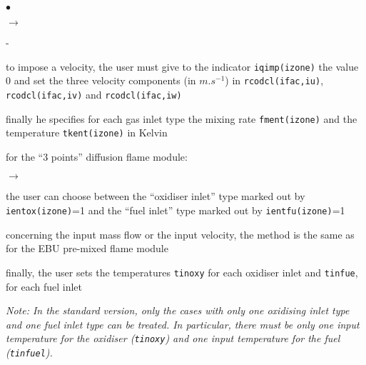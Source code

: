 {{{\begin{list}{$\bullet$}{}
\begin{list}{$\rightarrow$}{}
\begin{list}{-}{}
                                 \item to impose a velocity, the user
                                       must give to the indicator
                                       \texttt{iqimp(izone)} the value 0 and set
                                       the three velocity components (in
                                       $m.s^{-1}$) in
                                       \texttt{rcodcl(ifac,iu)},
                                       \texttt{rcodcl(ifac,iv)} and
                                       \texttt{rcodcl(ifac,iw)}
                          \end{list}
                    \item finally he specifies for each gas inlet type
                          the mixing rate \texttt{fment(izone)} and
                          the temperature \texttt{tkent(izone)} in Kelvin
             \end{list}

       \item for the ``3 points'' diffusion flame module:
             \begin{list}{$\rightarrow$}{}
                    \item the user can choose between the ``oxidiser
                          inlet'' type marked out by
                          \texttt{ientox(izone)}=1 and the ``fuel
                          inlet'' type marked out by
                          \texttt{ientfu(izone)}=1
                    \item concerning the input mass flow or the input
                          velocity, the method is the same as for the
                          EBU pre-mixed flame module
                    \item finally, the user sets the temperatures
                          \texttt{tinoxy} for each oxidiser inlet
                          and \texttt{tinfue}, for each fuel inlet

{\em Note: In the standard version, only the cases with only one
                          oxidising inlet type and one fuel inlet type
                          can be treated. In particular, there must be
                          only one input temperature for the oxidiser
                          (\texttt{tinoxy}) and one input temperature for the
                          fuel (\texttt{tinfuel}).}
             \end{list}


\end{list}}}}
